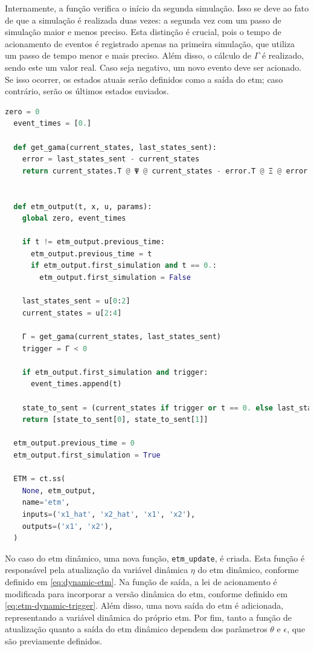 Internamente, a função verifica o início da segunda simulação. Isso se deve ao fato de que a simulação é realizada duas vezes: a segunda vez com um passo de simulação maior e menos preciso. Esta distinção é crucial, pois o tempo de acionamento de eventos é registrado apenas na primeira simulação, que utiliza um passo de tempo menor e mais preciso. Além disso, o cálculo de $\Gamma$ é realizado, sendo este um valor real. Caso seja negativo, um novo evento deve ser acionado. Se isso ocorrer, os estados atuais serão definidos como a saída do \acrshort{etm}; caso contrário, serão os últimos estados enviados.

\vspace{8pt}
\begin{lstlisting}[language=Python, caption={Implementação do \acrshort{etm} estático.}, label=cod:static_etm]
  zero = 0
  event_times = [0.]

  def get_gama(current_states, last_states_sent):
    error = last_states_sent - current_states
    return current_states.T @ Ψ @ current_states - error.T @ Ξ @ error


  def etm_output(t, x, u, params):
    global zero, event_times

    if t != etm_output.previous_time:
      etm_output.previous_time = t
      if etm_output.first_simulation and t == 0.:
        etm_output.first_simulation = False

    last_states_sent = u[0:2]
    current_states = u[2:4]

    Γ = get_gama(current_states, last_states_sent)
    trigger = Γ < 0

    if etm_output.first_simulation and trigger:
      event_times.append(t)

    state_to_sent = (current_states if trigger or t == 0. else last_states_sent)
    return [state_to_sent[0], state_to_sent[1]]

  etm_output.previous_time = 0
  etm_output.first_simulation = True

  ETM = ct.ss(
    None, etm_output,
    name='etm',
    inputs=('x1_hat', 'x2_hat', 'x1', 'x2'),
    outputs=('x1', 'x2'),
  )
\end{lstlisting}

No caso do \acrshort{etm} dinâmico, uma nova função, \texttt{etm\_update}, é criada. Esta função é responsável pela atualização da variável dinâmica $\eta$ do \acrshort{etm} dinâmico, conforme definido em \eqref{eq:dynamic-etm}. Na função de saída, a lei de acionamento é modificada para incorporar a versão dinâmica do \acrshort{etm}, conforme definido em \eqref{eq:etm-dynamic-trigger}. Além disso, uma nova saída do \acrshort{etm} é adicionada, representando a variável dinâmica do próprio \acrshort{etm}. Por fim, tanto a função de atualização quanto a saída do \acrshort{etm} dinâmico dependem dos parâmetros $\theta$ e $\epsilon$, que são previamente definidos.

